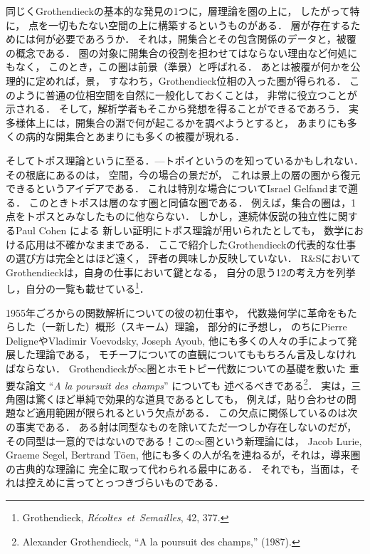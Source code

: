 \documentclass[11pt, a4paper, dvipdfmx]{jlreq}
\theoremstyle{definition}
\theoremstyle{mystyle}
\numberwithin{equation}{section} %
\begin{document}
同じくGrothendieckの基本的な発見の1つに，層理論を圏の上に，
したがって特に，
点を一切もたない空間の上に構築するというものがある．
層が存在するためには何が必要であろうか．
それは，開集合とその包含関係のデータと，被覆の概念である．
圏の対象に開集合の役割を担わせてはならない理由など何処にもなく，
このとき，この圏は前景（準景）と呼ばれる．
あとは被覆が何かを公理的に定めれば，景，
すなわち，Grothendieck位相の入った圏が得られる．
このように普通の位相空間を自然に一般化しておくことは，
非常に役立つことが示される．
そして，解析学者もそこから発想を得ることができるであろう．
実多様体上には，開集合の淵で何が起こるかを調べようとすると，
あまりにも多くの病的な開集合とあまりにも多くの被覆が現れる．

そしてトポス理論というに至る．---トポイというのを知っているかもしれない．
その根底にあるのは，
空間，今の場合の景だが，
これは景上の層の圏から復元できるというアイデアである．
これは特別な場合についてIsrael Gelfandまで遡る．
このときトポスは層のなす圏と同値な圏である．
例えば，集合の圏は，1点をトポスとみなしたものに他ならない．
しかし，連続体仮説の独立性に関するPaul Cohen による
新しい証明にトポス理論が用いられたとしても，
数学における応用は不確かなままである．
ここで紹介したGrothendieckの代表的な仕事の選び方は完全とはほど遠く，
評者の興味しか反映していない．
R\&SにおいてGrothendieckは，自身の仕事において鍵となる，
自分の思う12の考え方を列挙し，自分の一覧も載せている\footnote[12]{
    Grothendieck,
    \textit{R\'ecoltes\ et\ Semailles}, 42, 377.
}．

1955年ごろからの関数解析についての彼の初仕事や，
代数幾何学に革命をもたらした（一新した）概形（スキーム）理論，
部分的に予想し，
のちにPierre DeligneやVladimir Voevodsky, Joseph Ayoub, 
他にも多くの人々の手によって発展した理論である，
モチーフについての直観についてももちろん言及しなければならない．
Grothendieckが$\infty$圏とホモトピー代数についての基礎を敷いた
重要な論文 ``\textit{A la poursuit des champs}'' についても
述べるべきである\footnote[13]{
    Alexander Grothendieck, ``A la poursuit des champs,'' (1987).
}．
実は，三角圏は驚くほど単純で効果的な道具であるとしても，
例えば，貼り合わせの問題など適用範囲が限られるという欠点がある．
この欠点に関係しているのは次の事実である．
ある射は同型なものを除いてただ一つしか存在しないのだが，
その同型は一意的ではないのである！この$\infty$圏という新理論には，
Jacob Lurie, Graeme Segel, Bertrand T\"oen, 
他にも多くの人が名を連ねるが，それは，導来圏の古典的な理論に
完全に取って代わられる最中にある．
それでも，当面は，それは控えめに言ってとっつきづらいものである．



\maketitle
%
%
\end{document}
